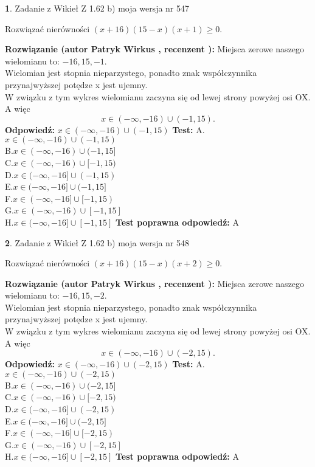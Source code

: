 \documentclass[12pt, a4paper]{article}
\theoremstyle{definition} %
\newtheorem{zad}{}
\newcommand{\zadStart}[1]{\begin{zad}#1\newline}
\newcommand{\zadStop}{\end{zad}}
\newcommand{\rozwStart}[2]{\noindent \textbf{Rozwiązanie (autor #1 , recenzent #2): }\newline}
\newcommand{\rozwStop}{\newline}
\newcommand{\odpStart}{\noindent \textbf{Odpowiedź:}\newline}
\newcommand{\odpStop}{\newline}
\newcommand{\testStart}{\noindent \textbf{Test:}\newline}
\newcommand{\testStop}{\newline}
\newcommand{\kluczStart}{\noindent \textbf{Test poprawna odpowiedź:}\newline}
\newcommand{\kluczStop}{\newline}
\begin{document}
\zadStart{Zadanie z Wikieł Z 1.62 b) moja wersja nr 547}

Rozwiązać nierówności $(x+16)(15-x)(x+1)\ge0$.
\zadStop
\rozwStart{Patryk Wirkus}{}
Miejsca zerowe naszego wielomianu to: $-16, 15, -1$.\\
Wielomian jest stopnia nieparzystego, ponadto znak współczynnika przy\linebreak najwyższej potędze x jest ujemny.\\ W związku z tym wykres wielomianu zaczyna się od lewej strony powyżej osi OX. A więc $$x \in (-\infty,-16) \cup (-1,15).$$
\rozwStop
\odpStart
$x \in (-\infty,-16) \cup (-1,15)$
\odpStop
\testStart
A.$x \in (-\infty,-16) \cup (-1,15)$\\
B.$x \in (-\infty,-16) \cup (-1,15]$\\
C.$x \in (-\infty,-16) \cup [-1,15)$\\
D.$x \in (-\infty,-16] \cup (-1,15)$\\
E.$x \in (-\infty,-16] \cup (-1,15]$\\
F.$x \in (-\infty,-16] \cup [-1,15)$\\
G.$x \in (-\infty,-16) \cup [-1,15]$\\
H.$x \in (-\infty,-16] \cup [-1,15]$
\testStop
\kluczStart
A
\kluczStop



\zadStart{Zadanie z Wikieł Z 1.62 b) moja wersja nr 548}

Rozwiązać nierówności $(x+16)(15-x)(x+2)\ge0$.
\zadStop
\rozwStart{Patryk Wirkus}{}
Miejsca zerowe naszego wielomianu to: $-16, 15, -2$.\\
Wielomian jest stopnia nieparzystego, ponadto znak współczynnika przy\linebreak najwyższej potędze x jest ujemny.\\ W związku z tym wykres wielomianu zaczyna się od lewej strony powyżej osi OX. A więc $$x \in (-\infty,-16) \cup (-2,15).$$
\rozwStop
\odpStart
$x \in (-\infty,-16) \cup (-2,15)$
\odpStop
\testStart
A.$x \in (-\infty,-16) \cup (-2,15)$\\
B.$x \in (-\infty,-16) \cup (-2,15]$\\
C.$x \in (-\infty,-16) \cup [-2,15)$\\
D.$x \in (-\infty,-16] \cup (-2,15)$\\
E.$x \in (-\infty,-16] \cup (-2,15]$\\
F.$x \in (-\infty,-16] \cup [-2,15)$\\
G.$x \in (-\infty,-16) \cup [-2,15]$\\
H.$x \in (-\infty,-16] \cup [-2,15]$
\testStop
\kluczStart
A
\kluczStop
\end{document}
